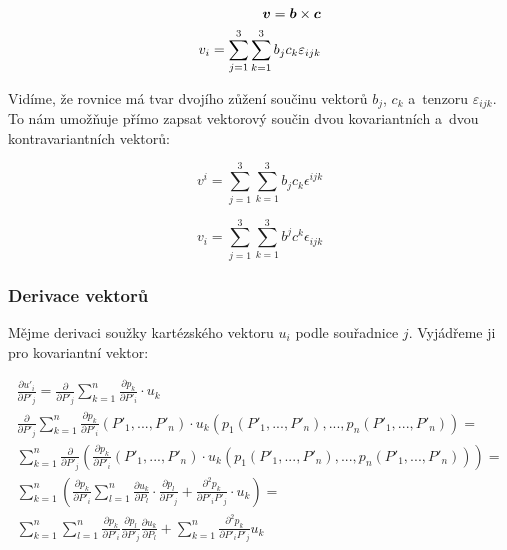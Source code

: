\begin{equation}
\begin{split}
\boldsymbol{v} = \boldsymbol{b} \times \boldsymbol{c} \\
v_i = \sum_{j=1}^3 \sum_{k=1}^3 b_j c_k \varepsilon_{ijk}
\end{split}
\end{equation}

Vidíme, že rovnice má tvar dvojího zůžení součinu vektorů \(b_j\), \(c_k\) a~tenzoru \(\varepsilon_{ijk}\). To nám umožňuje přímo zapsat vektorový součin dvou kovariantních a~dvou kontravariantních vektorů:

\begin{equation}
v^i = \sum_{j=1}^3 \sum_{k=1}^3 b_j c_k \epsilon^{ijk}
\end{equation}

\begin{equation}
v_i = \sum_{j=1}^3 \sum_{k=1}^3 b^j c^k \epsilon_{ijk}
\end{equation}

\subsubsection{Derivace vektorů}

Mějme derivaci soužky kartézského vektoru \(u_i\) podle souřadnice \(j\). Vyjádřeme ji pro kovariantní vektor:

\begin{equation}
\label{eq:derivace_vektoru}
\begin{split}
\frac{\partial u'_i}{\partial P'_j} = \frac{\partial}{\partial P'_j} \sum_{k=1}^n \frac{\partial p_k}{\partial P'_i} \cdot u_k \\
\frac{\partial}{\partial P'_j} \sum_{k=1}^n \frac{\partial p_k}{\partial P'_i}(P'_1, ..., P'_n) \cdot u_k(p_1(P'_1, ..., P'_n), ..., p_n(P'_1, ..., P'_n)) = \\
\sum_{k=1}^n \frac{\partial}{\partial P'_j} \left( \frac{\partial p_k}{\partial P'_i}(P'_1, ..., P'_n) \cdot u_k(p_1(P'_1, ..., P'_n), ..., p_n(P'_1, ..., P'_n)) \right) = \\
\sum_{k=1}^n \left(\frac{\partial p_k}{\partial P'_i} \sum_{l=1}^n \frac{\partial u_k}{\partial P_l} \cdot \frac{\partial p_l}{\partial P'_j} + \frac{\partial^2 p_k}{\partial P'_i P'_j} \cdot u_k \right) = \\
\sum_{k=1}^n \sum_{l=1}^n \frac{\partial p_k}{\partial P'_i} \frac{\partial p_l}{\partial P'_j} \frac{\partial u_k}{\partial P_l} + \sum_{k=1}^n \frac{\partial^2 p_k}{\partial P'_i P'_j} u_k
\end{split} 
\end{equation}

